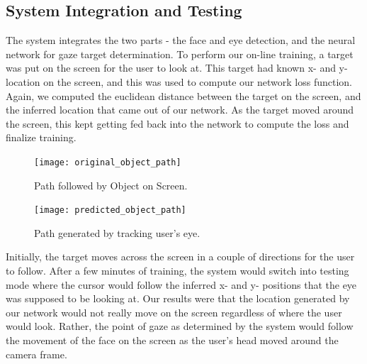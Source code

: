\documentclass[10pt,twocolumn,letterpaper]{article}
\begin{document}
\subsection{System Integration and Testing}
The system integrates the two parts - the face and eye detection, and
the neural network for gaze target determination. To perform our
on-line training, a target was put on the screen for the user to look
at. This target had known x- and y- location on the screen, and this
was used to compute our network loss function. Again, we computed the
euclidean distance between the target on the screen, and the inferred
location that came out of our network. As the target moved around the
screen, this kept getting fed back into the network to compute the
loss and finalize training.

\begin{figure}
  \begin{center}
    \texttt{[image: original\_object\_path]}
  \end{center}
  \caption{Path followed by Object on Screen.}
  \label{fig:originalpath}
\end{figure}



\begin{figure}
  \begin{center}
    \texttt{[image: predicted\_object\_path]}
  \end{center}
  \caption{Path generated by tracking user’s eye.}
  \label{fig:generatedpath}
\end{figure}


Initially, the target moves across the screen in a couple of
directions for the user to follow. After a few minutes of training,
the system would switch into testing mode where the cursor would
follow the inferred x- and y- positions that the eye was supposed to
be looking at. Our results were that the location generated by our
network would not really move on the screen regardless of where the
user would look. Rather, the point of gaze as determined by the system
would follow the movement of the face on the screen as the user's head
moved around the camera frame.
\end{document}
